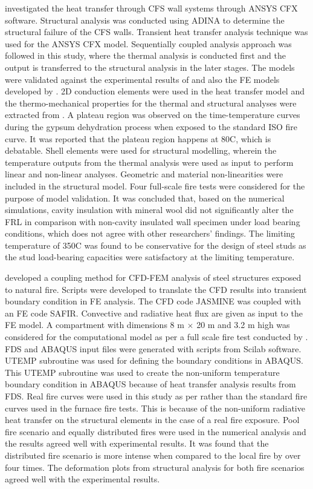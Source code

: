 \citet{Thanasoulas2016} investigated the heat transfer through CFS wall systems through ANSYS CFX software. Structural analysis was conducted using ADINA to determine the structural failure of the CFS walls. Transient heat transfer analysis technique was used for the ANSYS CFX model. Sequentially coupled analysis approach was followed in this study, where the thermal analysis is conducted first and the output is transferred to the structural analysis in the later stages. The models were validated against the experimental results of \citet{Gunalan2013e} and also the FE models developed by \citet{Gunalan2013f}. 2D conduction elements were used in the heat transfer model and the thermo-mechanical properties for the thermal and structural analyses were extracted from \citet{GhaziWakili2007,Kolaitis2013}. A plateau region was observed on the time-temperature curves during the gypsum dehydration process when exposed to the standard ISO fire curve. It was reported that the plateau region happens at 80\degree C, which is debatable. Shell elements were used for structural modelling, wherein the temperature outputs from the thermal analysis were used as input to perform linear and non-linear analyses. Geometric and material non-linearities were included in the structural model. Four full-scale fire tests were considered for the purpose of model validation. It was concluded that, based on the numerical simulations, cavity insulation with mineral wool did not significantly alter the FRL in comparison with non-cavity insulated wall specimen under load bearing conditions, which does not agree with other researchers' findings. The limiting temperature of 350\degree C was found to be conservative for the design of steel studs as the stud load-bearing capacities were satisfactory at the limiting temperature.      

\citet{Malendowski2017} developed a coupling method for CFD-FEM analysis of steel structures exposed to natural fire. Scripts were developed to translate the CFD results into transient boundary condition in FE analysis. The CFD code JASMINE was coupled with an FE code SAFIR. Convective and radiative heat flux are given as input to the FE model. A compartment with dimensions 8 m $\times$ 20 m and 3.2 m high was considered for the computational model as per a full scale fire test conducted by \citet{Pyl2012}. FDS and ABAQUS input files were generated with scripts from Scilab software. UTEMP subroutine was used for defining the boundary conditions in ABAQUS. This UTEMP subroutine was used to create the non-uniform temperature boundary condition in ABAQUS because of heat transfer analysis results from FDS. Real fire curves were used in this study as per \citet{Pyl2012} rather than the standard fire curves used in the furnace fire tests. This is because of the non-uniform radiative heat transfer on the structural elements in the case of a real fire exposure. Pool fire scenario and equally distributed fires were used in the numerical analysis and the results agreed well with experimental results. It was found that the distributed fire scenario is more intense when compared to the local fire by over four times. The deformation plots from structural analysis for both fire scenarios agreed well with the experimental results. 

